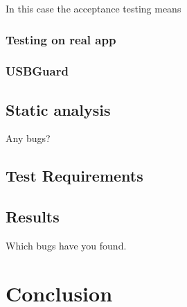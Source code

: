 In this case the acceptance testing means 

\subsection{Testing on real app}
\subsection{USBGuard}

\section{Static analysis}
Any bugs?

\section{Test Requirements}

\section{Results}
Which bugs have you found.

\chapter{Conclusion}



